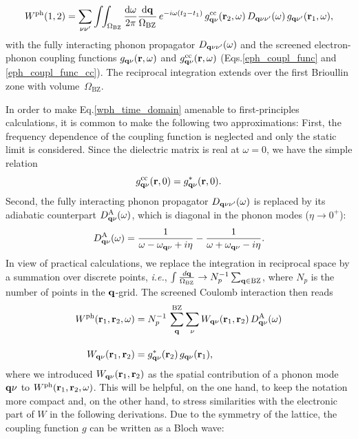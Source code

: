 \begin{equation}\nonumber
      W^\text{ph}(1,2) =  \sum_{\nu\nu'}\int\!\!\int_{\Omega_\text{BZ}}\frac{\text{d}\omega}{2\pi}\frac{\text{d}\mathbf{q}}{\Omega_\text{BZ}}\,e^{-i\omega(t_2-t_1)}\,
 g^\text{cc}_{\mathbf{q}\nu}(\mathbf{r}_2,\omega)\, D_{\mathbf{q}\nu\nu'}(\omega)\,g_{\mathbf{q}\nu'}(\mathbf{r}_1,\omega),
\end{equation}
%
with the  fully interacting phonon propagator $D_{\mathbf{q}\nu\nu'}(\omega)$ and the screened electron-phonon coupling functions $g_{\mathbf{q}\nu}(\mathbf{r},\omega)$ and $g^\text{cc}_{\mathbf{q}\nu}(\mathbf{r},\omega)$ (Eqs.\;\eqref{eph_coupl_func} and \eqref{eph_coupl_func_cc}). The reciprocal integration extends over the first Brioullin 
zone with volume~$\Omega_\text{BZ}$.\par
In order to make Eq.\;\ref{wph_time_domain} amenable to first-principles calculations, it is common \cite{Giustino} to make the following two approximations: First, the frequency dependence of the coupling function is neglected and only the static limit is considered. Since the dielectric matrix is real at $\omega=0$, we have the simple relation
\begin{equation}
    g^\text{cc}_{\mathbf{q}\nu}(\mathbf{r},0) = g^*_{\mathbf{q}\nu}(\mathbf{r},0).
\end{equation}
%
Second, the fully interacting phonon propagator $D_{\mathbf{q}\nu\nu'}(\omega)$ is replaced by its adiabatic counterpart $D^\text{A}_{\mathbf{q}\nu}(\omega)$, which is diagonal in the phonon modes ($\eta \rightarrow 0^+$):
%
\begin{align}\label{adiab_prop}
    D^\text{A}_{\mathbf{q}\nu}(\omega) = \frac{1}{\omega - \omega_{\mathbf{q}\nu} + i\eta} - \frac{1}{\omega + \omega_{\mathbf{q}\nu} - i\eta}.
\end{align}
%
In view of practical calculations, we replace the integration in reciprocal space by a summation over discrete points, \textit{i.e.}, ${\int\frac{d\mathbf{q}}{\Omega_\text{BZ}}\rightarrow N^{-1}_p\sum_{\mathbf{q}\in\text{BZ}}}$, where $N_p$ is the number of points in the $\mathbf{q}$-grid. The screened Coulomb interaction then reads
%
\begin{subequations}\label{w_realspace_set}
\begin{align}
 W^\text{ph}(\mathbf{r}_1,\mathbf{r}_2,\omega) & = N^{-1}_p\,\sum^\text{BZ}_{\mathbf{q}}\sum_\nu W_{\mathbf{q}\nu}(\mathbf{r}_1,\mathbf{r}_2)\,D^\text{A}_{\mathbf{q}\nu}(\omega)\label{w_realspace}\\[10pt]
 W_{\mathbf{q}\nu}(\mathbf{r}_1,\mathbf{r}_2) & = g^*_{\mathbf{q}\nu}(\mathbf{r}_2)\,g_{\mathbf{q}\nu}(\mathbf{r}_1)\label{w_spat_behvaiour},
\end{align}
\end{subequations}
%
where we introduced $W_{\mathbf{q}\nu}(\mathbf{r}_1,\mathbf{r}_2)$ as the spatial contribution of a phonon mode ${\mathbf{q}\nu}$ to $W^\text{ph}(\mathbf{r}_1,\mathbf{r}_2,\omega) $. This will be helpful, on the one hand, to keep the notation more compact and, on the other hand, to stress similarities with the electronic part of $W$ in the following derivations.  Due to the symmetry of the lattice, the coupling function $g$ can be written as a Bloch wave:
